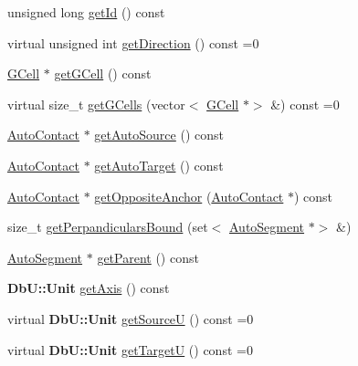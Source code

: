 \begin{DoxyCompactItemize}
\item 
unsigned long \mbox{\hyperlink{classKatabatic_1_1AutoSegment_afdedcef127ad2a3677a5b48d7d3453f3}{get\+Id}} () const
\item 
virtual unsigned int \mbox{\hyperlink{classKatabatic_1_1AutoSegment_ae35b78590ed6aa546b626ef95f28c533}{get\+Direction}} () const =0
\item 
\mbox{\hyperlink{classKatabatic_1_1GCell}{G\+Cell}} $\ast$ \mbox{\hyperlink{classKatabatic_1_1AutoSegment_a819cf639562a031a1e2e061fe1293d66}{get\+G\+Cell}} () const
\item 
virtual size\+\_\+t \mbox{\hyperlink{classKatabatic_1_1AutoSegment_a8ca0022e253d355817d46a057ae01625}{get\+G\+Cells}} (vector$<$ \mbox{\hyperlink{classKatabatic_1_1GCell}{G\+Cell}} $\ast$$>$ \&) const =0
\item 
\mbox{\hyperlink{classKatabatic_1_1AutoContact}{Auto\+Contact}} $\ast$ \mbox{\hyperlink{classKatabatic_1_1AutoSegment_a2ca3fac97e325ec8a55d3e03a2ce11a6}{get\+Auto\+Source}} () const
\item 
\mbox{\hyperlink{classKatabatic_1_1AutoContact}{Auto\+Contact}} $\ast$ \mbox{\hyperlink{classKatabatic_1_1AutoSegment_afa494ddc031f4dd1c24999ff83fb878c}{get\+Auto\+Target}} () const
\item 
\mbox{\hyperlink{classKatabatic_1_1AutoContact}{Auto\+Contact}} $\ast$ \mbox{\hyperlink{classKatabatic_1_1AutoSegment_a2c5b0faacc768bf61e17eb72a4ccc248}{get\+Opposite\+Anchor}} (\mbox{\hyperlink{classKatabatic_1_1AutoContact}{Auto\+Contact}} $\ast$) const
\item 
size\+\_\+t \mbox{\hyperlink{classKatabatic_1_1AutoSegment_a206b53c34f57945b6c7bdb711101e38f}{get\+Perpandiculars\+Bound}} (set$<$ \mbox{\hyperlink{classKatabatic_1_1AutoSegment}{Auto\+Segment}} $\ast$$>$ \&)
\item 
\mbox{\hyperlink{classKatabatic_1_1AutoSegment}{Auto\+Segment}} $\ast$ \mbox{\hyperlink{classKatabatic_1_1AutoSegment_a58c1170381b915930188608dab311442}{get\+Parent}} () const
\item 
\textbf{ Db\+U\+::\+Unit} \mbox{\hyperlink{classKatabatic_1_1AutoSegment_ab5b5aaa5b318369feee6003dbad039c2}{get\+Axis}} () const
\item 
virtual \textbf{ Db\+U\+::\+Unit} \mbox{\hyperlink{classKatabatic_1_1AutoSegment_aeaa1543880686755e389c4807128428f}{get\+SourceU}} () const =0
\item 
virtual \textbf{ Db\+U\+::\+Unit} \mbox{\hyperlink{classKatabatic_1_1AutoSegment_a828fef2716cc9c370d6d170bb96556ec}{get\+TargetU}} () const =0

\end{DoxyCompactItemize}
